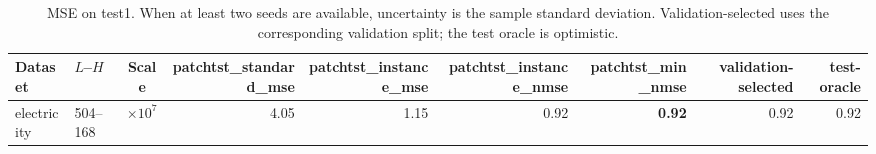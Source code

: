 \begin{table}[htbp]
\centering
\caption{MSE on test1. When at least two seeds are available, uncertainty is the sample standard deviation. Validation-selected uses the corresponding validation split; the test oracle is optimistic.}
\begin{tabular}{llcrrrrr|r}
\toprule
Dataset & $L$--$H$ & Scale & patchtst\_standard\_mse & patchtst\_instance\_mse & patchtst\_instance\_nmse & patchtst\_min\_nmse & validation-selected & test-oracle \\
\midrule
electricity & 504--168 & $\times 10^{7}$ & 4.05 & 1.15 & 0.92 & \textbf{0.92} & 0.92 & 0.92 \\
\bottomrule
\end{tabular}
\end{table}
